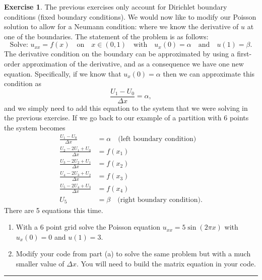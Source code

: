 \documentclass[
]{book}
\providecommand{\tightlist}{%
  \setlength{\itemsep}{0pt}\setlength{\parskip}{0pt}}
\theoremstyle{definition}
\theoremstyle{definition}
\theoremstyle{definition}
\newtheorem{exercise}{Exercise}[chapter]
\theoremstyle{remark}
\begin{document}
\begin{exercise}
\protect\hypertarget{exr:unnamed-chunk-602}{}{\label{exr:unnamed-chunk-602} }The previous exercises only account for Dirichlet boundary conditions (fixed boundary conditions). We would now like to modify our Poisson solution to allow for a Neumann condition: where we know the derivative of \(u\) at one of the boundaries. The statement of the problem is as follows:
\[\text{Solve: } u_{xx} = f(x) \quad \text{on} \quad x \in (0,1) \quad \text{with} \quad u_x(0) = \alpha \quad \text{and} \quad u(1) = \beta.\]
The derivative condition on the boundary can be approximated by using a first-order approximation of the derivative, and as a consequence we have one new equation. Specifically, if we know that \(u_x(0) = \alpha\) then we can approximate this condition as
\[ \frac{U_1 - U_0}{\Delta x} = \alpha, \]
and we simply need to add this equation to the system that we were solving in the previous exercise. If we go back to our example of a partition with 6 points the system becomes
\[\begin{aligned}
\frac{U_1 - U_0}{\Delta x} &= \alpha \quad \text{(left boundary condition)}\\
\frac{U_2 - 2U_1 + U_0}{\Delta x} &= f(x_1) \\ 
\frac{U_3 - 2U_2 + U_1}{\Delta x} &= f(x_2) \\ 
\frac{U_4 - 2U_3 + U_2}{\Delta x} &= f(x_3) \\ 
\frac{U_5 - 2U_4 + U_3}{\Delta x} &= f(x_4) \\ 
U_5 &= \beta \quad \text{(right boundary condition).}
\end{aligned}\]
There are 5 equations this time.

\begin{enumerate}
\def\labelenumi{\alph{enumi}.}
\tightlist
\item
  With a 6 point grid solve the Poisson equation \(u_{xx} = 5\sin(2\pi x)\) with \(u_x(0) = 0\) and \(u(1) = 3\).
\item
  Modify your code from part (a) to solve the same problem but with a much smaller value of \(\Delta x\). You will need to build the matrix equation in your code.
\end{enumerate}
\end{exercise}

\begin{center}\rule{0.5\linewidth}{0.5pt}\end{center}
\end{document}
